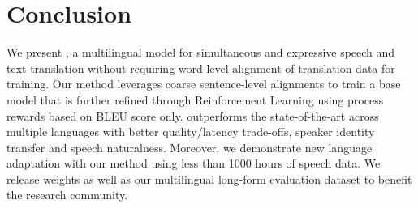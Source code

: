 \section{Conclusion}
\label{sec:conclusion}

We present \ours{}, a multilingual model for simultaneous and expressive speech and text translation without requiring word-level alignment of translation data for training. Our method leverages coarse sentence-level alignments to train a base model that is further refined through Reinforcement Learning using process rewards based on BLEU score only. \ours{} outperforms the state-of-the-art across multiple languages with better quality/latency trade-offs, speaker identity transfer and speech naturalness. Moreover, we demonstrate new language adaptation with our method using less than 1000 hours of speech data. We release \ours{} weights as well as our multilingual long-form evaluation dataset to benefit the research community.